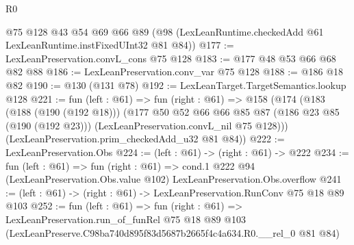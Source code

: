 \begin{lexlean}{R0}
\begin{coremodule}
    @75
    @128
    @43
    @54
    @69
    @66
    @89
    (@98 (LexLeanRuntime.checkedAdd @61 LexLeanRuntime.instFixedUInt32 @81 @84))
@177 := LexLeanPreservation.convL_cons @75 @128
@183 := @177 @48 @53 @66 @68 @82 @88
@186 := LexLeanPreservation.conv_var @75 @128
@188 := @186 @18 @82
@190 := @130 (@131 @78)
@192 := LexLeanTarget.TargetSemantics.lookup @128
@221 := fun (left : @61) =>
  fun (right : @61) =>
  @158
    (@174
      (@183
        (@188 (@190 (@192 @18)))
        (@177
          @50
          @52
          @66
          @66
          @85
          @87
          (@186 @23 @85 (@190 (@192 @23)))
          (LexLeanPreservation.convL_nil @75 @128)))
      (LexLeanPreservation.prim_checkedAdd_u32 @81 @84))
@222 := LexLeanPreservation.Obs
@224 := (left : @61) -> (right : @61) -> @222
@234 := fun (left : @61) =>
  fun (right : @61) =>
  cond.{1} @222 @94 (LexLeanPreservation.Obs.value @102) LexLeanPreservation.Obs.overflow
@241 := (left : @61) -> (right : @61) -> LexLeanPreservation.RunConv @75 @18 @89 @103
@252 := fun (left : @61) =>
  fun (right : @61) =>
  LexLeanPreservation.run_of_funRel
    @75
    @18
    @89
    @103
    (LexLeanPreserve.C98ba740d895f83d5687b2665f4c4a634.R0.__rel_0 @81 @84)
\end{coremodule}
\end{lexlean}
